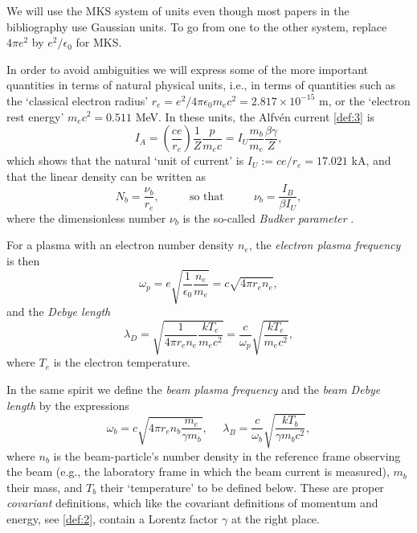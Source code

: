 \documentclass [12pt,a4paper,     ]{report} %
\newcommand{\DEF}{:=}                 %
\begin{document}
   We will use the MKS system of units even though most papers in the bibliography use Gaussian units. To go from one to the other system, replace $4\pi e^2$ by $e^2/\epsilon_0$ for MKS.

   In order to avoid ambiguities we will express some of the more important quantities in terms of natural physical units, i.e., in terms of quantities such as the `{classical electron radius}' $r_e=e^2/4\pi\epsilon_0m_e c^2= 2.817 \times 10^{-15}$ m, or the `{electron rest energy}' $m_e c^2= 0.511$ MeV.  In these units, the Alfv\'en current \eqref{def:3} is
%
\begin{equation}\label{def:7} %
	I_A =  (\frac{ce}{r_e}) \frac{1}{Z} \frac{p}{m_e c}
            =  I_U \frac{m_b}{m_e}\frac{\beta\gamma}{Z},
\end{equation}
%
which shows that the natural `{unit of current}' is $I_U\DEF ce/r_e = 17.021$ kA, and that the linear density can be written as
%
\begin{equation}\label{def:7-1} %
          N_b = \frac{\nu_b}{r_e}, \text{~~~ ~~~ so that ~~~ ~~~}
        \nu_b = \frac{I_B}{\beta I_U},
\end{equation}
%
where the dimensionless number $\nu_b$ is the so-called \emph{Budker parameter} \cite{BUDKE1956A}.
 

   For a plasma with an {electron number density} $n_e$, the \emph{electron plasma frequency} is then
%
\begin{equation}\label{def:8} %
	\omega_p = e \sqrt{\frac{1}{\epsilon_0} \frac{n_e}{m_e}  }
                 = c \sqrt{4\pi r_e n_e},
\end{equation}
%
and the \emph{Debye length}
%
\begin{equation}\label{def:9} %
	\lambda_D = \sqrt{\frac{1}{4\pi r_e n_e} \frac{kT_e}{m_e c^2}}
                  = \frac{c}{\omega_p} \sqrt{\frac{kT_e}{m_e c^2}},
\end{equation}
%
where  $T_e$ is the {electron temperature}. 

  In the same spirit we define the \emph{beam plasma frequency} and the \emph{beam Debye length} by the expressions
%
\begin{equation}\label{def:10} %
	\omega_b  = c \sqrt{4\pi r_e n_b \frac{m_e}{\gamma m_b}}, ~~~  ~~~
        \lambda_B = \frac{c}{\omega_b} \sqrt{\frac{kT_b}{\gamma m_b c^2}},
\end{equation}
%
where $n_b$ is the beam-particle's number density in the reference frame observing the beam (e.g., the laboratory frame in which the beam current is measured), $m_b$ their mass, and $T_b$ their `temperature' to be defined below.  These are proper \emph{covariant} definitions, which like the covariant definitions of  momentum and energy, see \eqref{def:2}, contain a Lorentz factor $\gamma$ at the right place.
\end{document}
